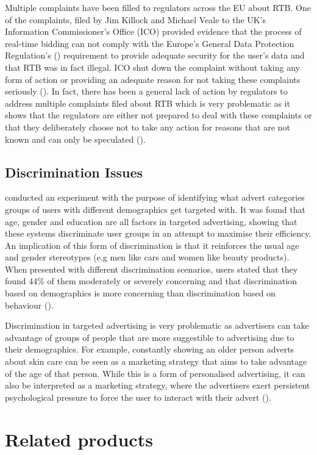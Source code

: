 \documentclass{l4proj}
\begin{document}
Multiple complaints have been filled to regulators across the EU about RTB. One of the complaints, filed by Jim Killock and Michael Veale to the UK's Information Commissioner's Office (ICO) provided evidence that the process of real-time bidding can not comply with the Europe’s General Data Protection Regulation's (\cite{gdpr}) requirement to provide adequate security for the user's data and that RTB was in fact illegal. ICO shut down the complaint without taking any form of action or providing an adequate reason for not taking these complaints seriously (\cite{rtbcomplaint}). In fact, there has been a general lack of action by regulators to address multiple complaints filed about RTB which is very problematic as it shows that the regulators are either not prepared to deal with these complaints or that they deliberately choose not to take any action for reasons that are not known and can only be speculated (\cite{report}).

\subsection{Discrimination Issues}
\cite{Bol2019a} conducted an experiment with the purpose of identifying what advert categories groups of users with different demographics get targeted with. It was found that age, gender and education are all factors in targeted advertising, showing that these systems discriminate user groups in an attempt to maximise their efficiency. An implication of this form of discrimination is that it reinforces the usual age and gender stereotypes (e.g men like cars and women like beauty products). When presented with different discrimination scenarios, users stated that they found 44\% of them moderately or severely concerning and that discrimination based on demographics is more concerning than discrimination based on behaviour (\cite{Plane2017}).

Discrimination in targeted advertising is very problematic as advertisers can take advantage of groups of people that are more suggestible to advertising due to their demographics. For example, constantly showing an older person adverts about skin care can be seen as a marketing strategy that aims to take advantage of the age of that person. While this is a form of personalised advertising, it can also be interpreted as a marketing strategy, where the advertisers exert persistent psychological pressure to force the user to interact with their advert (\cite{fennis2015psychology}).

\section{Related products}
\label{related}
\end{document}
